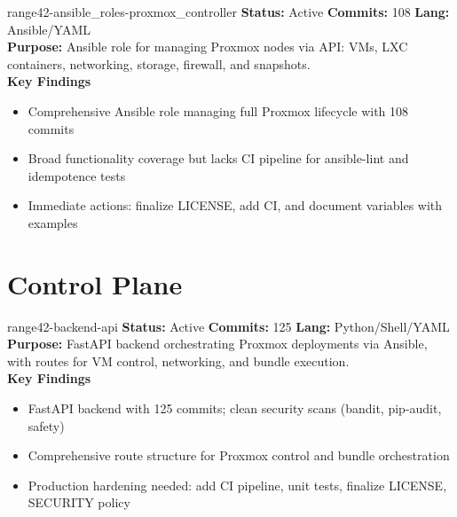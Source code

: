 \documentclass[aspectratio=169]{beamer}
\begin{document}
\begin{frame}{range42-ansible\_roles-proxmox\_controller \; \faCogs}
  \textbf{Status:} Active \hfill \textbf{Commits:} 108 \hfill \textbf{Lang:} Ansible/YAML\\[2mm]
  \textbf{Purpose:} Ansible role for managing Proxmox nodes via API: VMs, LXC containers, networking, storage, firewall, and snapshots.\\[2mm]
  \textbf{Key Findings}
  \begin{itemize}
    \item Comprehensive Ansible role managing full Proxmox lifecycle with 108 commits
    \item Broad functionality coverage but lacks CI pipeline for ansible-lint and idempotence tests
    \item Immediate actions: finalize LICENSE, add CI, and document variables with examples
  \end{itemize}
\end{frame}

\section{Control Plane}

\begin{frame}{range42-backend-api \; \faProjectDiagram}
  \textbf{Status:} Active \hfill \textbf{Commits:} 125 \hfill \textbf{Lang:} Python/Shell/YAML\\[2mm]
  \textbf{Purpose:} FastAPI backend orchestrating Proxmox deployments via Ansible, with routes for VM control, networking, and bundle execution.\\[2mm]
  \textbf{Key Findings}
  \begin{itemize}
    \item FastAPI backend with 125 commits; clean security scans (bandit, pip-audit, safety)
    \item Comprehensive route structure for Proxmox control and bundle orchestration
    \item Production hardening needed: add CI pipeline, unit tests, finalize LICENSE, SECURITY policy
  \end{itemize}
\end{frame}
\end{document}
